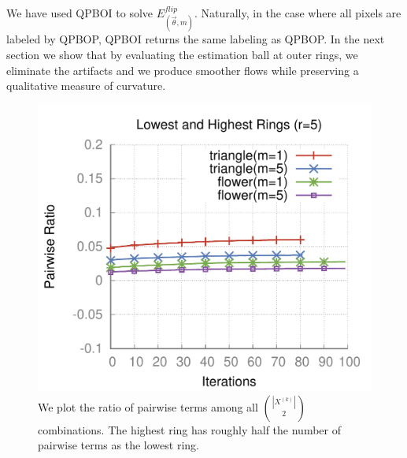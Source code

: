   We have used QPBOI to solve $E_{(\vec{\theta},m)}^{flip}$. Naturally, in the case where all pixels are labeled by QPBOP, QPBOI returns the same labeling as QPBOP. In the next section we show that by evaluating the estimation ball at outer rings, we eliminate the artifacts and we produce smoother flows while preserving a qualitative measure of curvature.
  


\begin{figure}
\center
\includegraphics[scale=0.5]{figures/chapter6/unlabeled-ratio/plots/pairwise-ratio/h0.25/radius-5/plot-pairwiseratio-lowerHigher-concavities-probe.pdf}
\caption{We plot the ratio of pairwise terms among all $\binom{|X^{(k)}|}{2}$ combinations. The highest ring has roughly half the number of pairwise terms as the lowest ring.}
\label{ch6:fig:ratio-pairwise-terms}
\end{figure}


